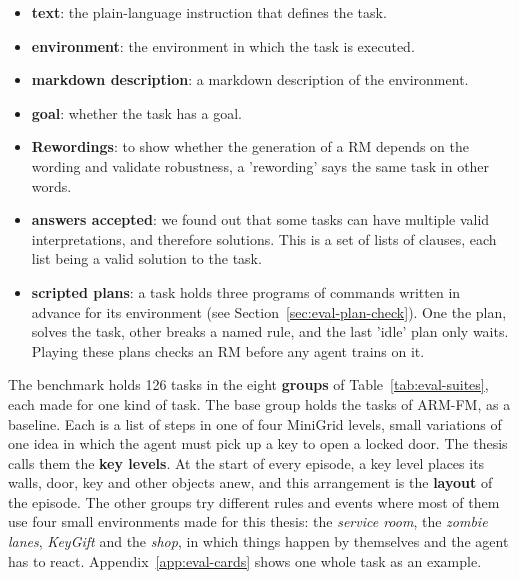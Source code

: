 \documentclass[11pt,english,listoffigures,listoftables]{tfgetsinf}
\newcommand{\env}[1]{\textsf{\slshape #1}}  %
\begin{document}
\begin{itemize}
    \item \textbf{text}: the plain-language instruction that defines the task.
    \item \textbf{environment}: the environment in which the task is executed.
    \item \textbf{markdown description}: a markdown description of the environment.
    \item \textbf{goal}: whether the task has a goal.
    \item \textbf{Rewordings}: to show whether the generation of a RM depends on the wording and validate robustness, a 'rewording' says the same task in other words.
    \item \textbf{answers accepted}: we found out that some tasks can have multiple valid interpretations, and therefore solutions. This is a set of lists of clauses, each list being a valid solution to the task.
    \item \textbf{scripted plans}: a task holds three programs of commands written in advance for its environment (see Section~\ref{sec:eval-plan-check}). One the plan, solves the task, other breaks a named rule, and the last 'idle' plan only waits. Playing these plans checks an RM before any agent trains on it.  
\end{itemize}

The benchmark holds 126 tasks in the eight \textbf{groups} of Table~\ref{tab:eval-suites}, each made for one kind of task. The base group holds the tasks of ARM-FM, as a baseline. Each is a list of steps in one of four MiniGrid levels, small variations of one idea in which the agent must pick up a key to open a locked door. The thesis calls them the \textbf{key levels}. At the start of every episode, a key level places its walls, door, key and other objects anew, and this arrangement is the \textbf{layout} of the episode. The other groups try different rules and events where most of them use four small environments made for this thesis: the \env{service room}, the \env{zombie lanes}, \env{KeyGift} and the \env{shop}, in which things happen by themselves and the agent has to react. Appendix~\ref{app:eval-cards} shows one whole task as an example.
\end{document}
